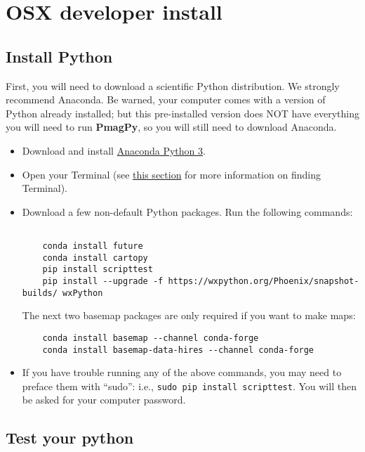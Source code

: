 \documentclass[11pt]{article}
\begin{document}
\tableofcontents

\section{OSX developer install}

\subsection{Install Python}
First, you will need to download a scientific Python distribution.  We strongly recommend Anaconda.  Be warned, your computer comes with a version of Python already installed; but this pre-installed version does NOT have everything you will need to run {\bf PmagPy}, so you will still need to download Anaconda.

\begin{itemize}
   \item Download and install \href{https://www.anaconda.com/download}{Anaconda Python 3}.
   \item Open your Terminal (see \href{https://earthref.org/PmagPy/cookbook/#command_line}{this section} for more information on finding Terminal).
   \item Download a few non-default Python packages.  Run the following commands: \begin{verbatim}

    conda install future
    conda install cartopy
    pip install scripttest
    pip install --upgrade -f https://wxpython.org/Phoenix/snapshot-builds/ wxPython
\end{verbatim}
     The next two basemap packages are only required if you want to make maps:
\begin{verbatim}
    conda install basemap --channel conda-forge
    conda install basemap-data-hires --channel conda-forge

\end{verbatim}

\item If you have trouble running any of the above commands, you may need to preface them with ``sudo'': i.e., \texttt{sudo pip install scripttest}.  You will then be asked for your computer password.

  \end{itemize}



\subsection{Test your python}
\end{document}
